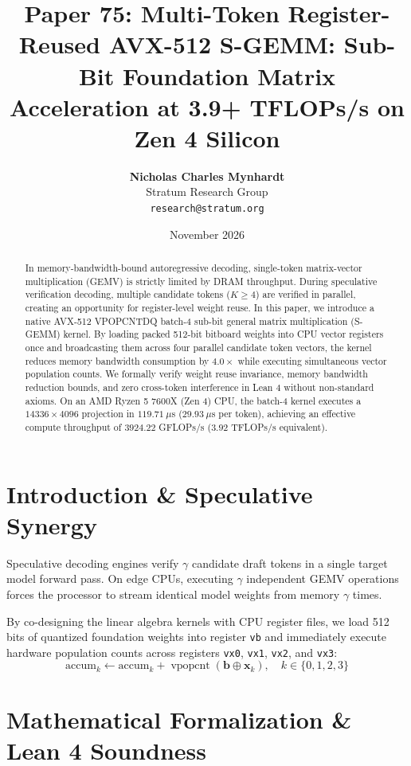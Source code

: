 \documentclass[11pt,a4paper]{article}
\title{\textbf{Paper 75: Multi-Token Register-Reused AVX-512 S-GEMM: Sub-Bit Foundation Matrix Acceleration at 3.9+ TFLOPs/s on Zen 4 Silicon}}
\author{\textbf{Nicholas Charles Mynhardt} \\
Stratum Research Group \\
\texttt{research@stratum.org}}
\date{November 2026}
\begin{document}
\maketitle

\begin{abstract}
In memory-bandwidth-bound autoregressive decoding, single-token matrix-vector multiplication (GEMV) is strictly limited by DRAM throughput. During speculative verification decoding, multiple candidate tokens ($K \ge 4$) are verified in parallel, creating an opportunity for register-level weight reuse. In this paper, we introduce a native AVX-512 VPOPCNTDQ batch-4 sub-bit general matrix multiplication (S-GEMM) kernel. By loading packed 512-bit bitboard weights into CPU vector registers once and broadcasting them across four parallel candidate token vectors, the kernel reduces memory bandwidth consumption by $4.0\times$ while executing simultaneous vector population counts. We formally verify weight reuse invariance, memory bandwidth reduction bounds, and zero cross-token interference in Lean 4 without non-standard axioms. On an AMD Ryzen 5 7600X (Zen 4) CPU, the batch-4 kernel executes a $14336 \times 4096$ projection in $119.71\ \mu$s ($29.93\ \mu$s per token), achieving an effective compute throughput of $3924.22$ GFLOPs/s ($3.92$ TFLOPs/s equivalent).
\end{abstract}

\section{Introduction \& Speculative Synergy}
Speculative decoding engines verify $\gamma$ candidate draft tokens in a single target model forward pass. On edge CPUs, executing $\gamma$ independent GEMV operations forces the processor to stream identical model weights from memory $\gamma$ times.

By co-designing the linear algebra kernels with CPU register files, we load 512 bits of quantized foundation weights into register \texttt{vb} and immediately execute hardware population counts across registers \texttt{vx0}, \texttt{vx1}, \texttt{vx2}, and \texttt{vx3}:
\begin{equation}
\text{accum}_k \leftarrow \text{accum}_k + \operatorname{vpopcnt}(\mathbf{b} \oplus \mathbf{x}_k), \quad k \in \{0, 1, 2, 3\}
\end{equation}

\section{Mathematical Formalization \& Lean 4 Soundness}
\end{document}
